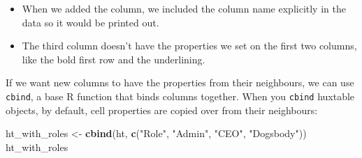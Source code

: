 \documentclass[]{article}
\newenvironment{Shaded}{\begin{snugshade}}{\end{snugshade}}
\newcommand{\KeywordTok}[1]{\textcolor[rgb]{0.13,0.29,0.53}{\textbf{#1}}}
\newcommand{\StringTok}[1]{\textcolor[rgb]{0.31,0.60,0.02}{#1}}
\newcommand{\NormalTok}[1]{#1}
\providecommand{\tightlist}{%
  \setlength{\itemsep}{0pt}\setlength{\parskip}{0pt}}
\begin{document}
\begin{itemize}
\tightlist
\item
  When we added the column, we included the column name explicitly in
  the data so it would be printed out.
\item
  The third column doesn't have the properties we set on the first two
  columns, like the bold first row and the underlining.
\end{itemize}

If we want new columns to have the properties from their neighbours, we
can use \texttt{cbind}, a base R function that binds columns together.
When you \texttt{cbind} huxtable objects, by default, cell properties
are copied over from their neighbours:

\begin{Shaded}
\begin{Highlighting}[]
\NormalTok{ht_with_roles <-}\StringTok{ }\KeywordTok{cbind}\NormalTok{(ht, }\KeywordTok{c}\NormalTok{(}\StringTok{"Role"}\NormalTok{, }\StringTok{"Admin"}\NormalTok{, }\StringTok{"CEO"}\NormalTok{, }\StringTok{"Dogsbody"}\NormalTok{))}
\NormalTok{ht_with_roles}
\end{Highlighting}
\end{Shaded}
\end{document}

